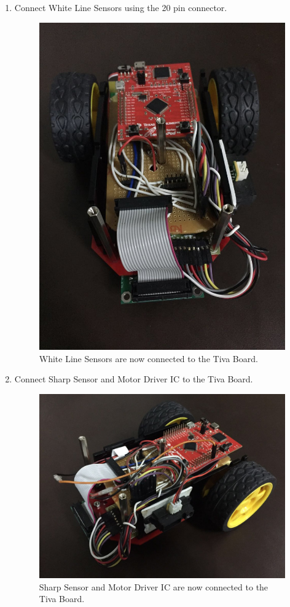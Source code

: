 \documentclass[a4paper,12pt,oneside]{book}
\begin{document}
\begin{enumerate}
	\item Connect White Line Sensors using the 20 pin connector.
	\begin{figure}[h]
		\centering
		\includegraphics[scale=0.16]{wh_attatched}
		\caption{White Line Sensors are now connected to the Tiva Board.}
	\end{figure}
	
	\item Connect Sharp Sensor and Motor Driver IC to the Tiva Board.
	\begin{figure}[h]
		\centering
		\includegraphics[scale=0.16]{all_connected}
		\caption{Sharp Sensor and Motor Driver IC are now connected to the Tiva Board.}
	\end{figure}
	\newpage
	

\end{enumerate}
\end{document}
